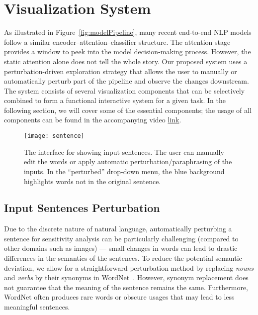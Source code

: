 
\section{Visualization System}
As illustrated in Figure~\ref{fig:modelPipeline}, many recent end-to-end NLP models follow a similar encoder--attention--classifier structure. The attention stage provides a window to peek into the model decision-making process. 
However, the static attention alone does not tell the whole story. 
Our proposed system uses a perturbation-driven exploration strategy that allows the user to manually or automatically perturb part of the pipeline and observe the changes downstream.
%
The system consists of several visualization components that can be selectively combined to form a functional interactive system for a given task. In the following section, we will cover some of the essential components; the usage of all components can be found in the accompanying video \href{https://www.youtube.com/watch?v=PKiM4i0oIuY}{link}.

\begin{figure}[htbp]
\centering
\vspace{-2mm}
 \texttt{[image: sentence]}
 \vspace{-2mm}
 \caption{
The interface for showing input sentences. The user can manually edit the words or apply automatic perturbation/paraphrasing of the inputs. In the ``perturbed'' drop-down menu, the blue background highlights words not in the original sentence.
 }
 \vspace{-1mm}
\label{fig:sentence}
\end{figure}

\subsection{Input Sentences Perturbation}
\label{sec:perturb}
Due to the discrete nature of natural language, automatically perturbing a sentence for sensitivity analysis can be particularly challenging (compared to other domains such as images) --- small changes in words can lead to drastic differences in the semantics of the sentences.
To reduce the potential semantic deviation, we allow for a straightforward perturbation method by replacing \emph{nouns} and \emph{verbs} by their synonyms in WordNet~\cite{Miller1995}. However, synonym replacement does not guarantee that the meaning of the sentence remains the same. Furthermore, WordNet often produces rare words or obscure usages that may lead to less meaningful sentences.

